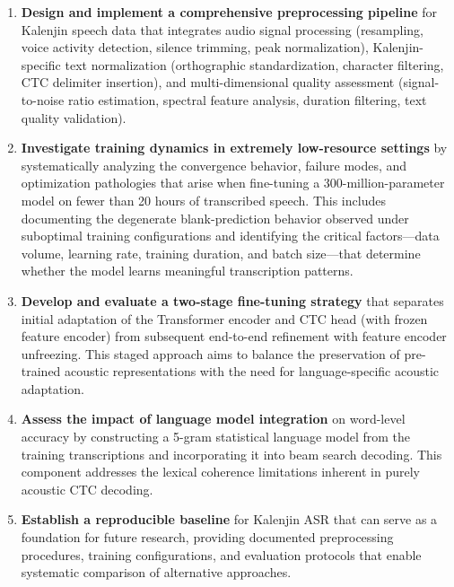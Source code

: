 \documentclass[12pt,a4paper]{article}
\begin{document}
\begin{enumerate}[label=\textbf{\arabic*.}, leftmargin=2em]
    \item \textbf{Design and implement a comprehensive preprocessing pipeline} for Kalenjin speech data that integrates audio signal processing (resampling, voice activity detection, silence trimming, peak normalization), Kalenjin-specific text normalization (orthographic standardization, character filtering, CTC delimiter insertion), and multi-dimensional quality assessment (signal-to-noise ratio estimation, spectral feature analysis, duration filtering, text quality validation).

    \item \textbf{Investigate training dynamics in extremely low-resource settings} by systematically analyzing the convergence behavior, failure modes, and optimization pathologies that arise when fine-tuning a 300-million-parameter model on fewer than 20 hours of transcribed speech. This includes documenting the degenerate blank-prediction behavior observed under suboptimal training configurations and identifying the critical factors---data volume, learning rate, training duration, and batch size---that determine whether the model learns meaningful transcription patterns.

    \item \textbf{Develop and evaluate a two-stage fine-tuning strategy} that separates initial adaptation of the Transformer encoder and CTC head (with frozen feature encoder) from subsequent end-to-end refinement with feature encoder unfreezing. This staged approach aims to balance the preservation of pre-trained acoustic representations with the need for language-specific acoustic adaptation.

    \item \textbf{Assess the impact of language model integration} on word-level accuracy by constructing a 5-gram statistical language model from the training transcriptions and incorporating it into beam search decoding. This component addresses the lexical coherence limitations inherent in purely acoustic CTC decoding.

    \item \textbf{Establish a reproducible baseline} for Kalenjin ASR that can serve as a foundation for future research, providing documented preprocessing procedures, training configurations, and evaluation protocols that enable systematic comparison of alternative approaches.
\end{enumerate}
\end{document}
